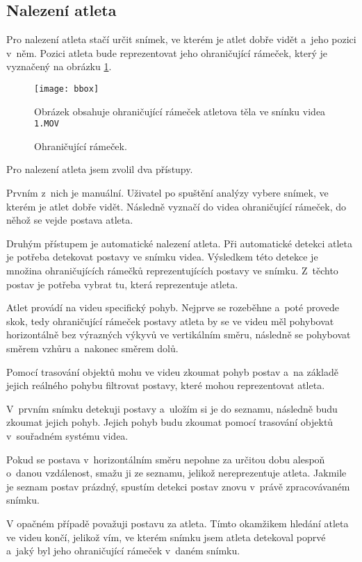 \subsection{Nalezení atleta}

Pro nalezení atleta stačí určit snímek, ve kterém je atlet dobře vidět a~jeho pozici v~něm. Pozici atleta bude reprezentovat jeho ohraničující rámeček, který je vyznačený na obrázku \ref{fig:bbox}.

\begin{figure}[h]\centering
    \texttt{[image: bbox]}
    \caption{Ohraničující rámeček.}
    \small
    Obrázek obsahuje ohraničující rámeček atletova těla ve snínku videa \texttt{1.MOV}
    \label{fig:bbox}
\end{figure}

Pro nalezení atleta jsem zvolil dva přístupy.

Prvním z~nich je manuální. Uživatel po spuštění analýzy vybere snímek, ve kterém je atlet dobře vidět. Následně vyznačí do videa ohraničující rámeček, do něhož se vejde postava atleta.

Druhým přístupem je automatické nalezení atleta. Při automatické detekci atleta je potřeba detekovat postavy ve snímku videa. Výsledkem této detekce je množina ohraničujících rámečků reprezentujících postavy ve snímku. Z~těchto postav je potřeba vybrat tu, která reprezentuje atleta.

Atlet provádí na videu specifický pohyb. Nejprve se rozeběhne a~poté provede skok, tedy ohraničující rámeček postavy atleta by se ve videu měl pohybovat horizontálně bez výrazných výkyvů ve vertikálním směru, následně se pohybovat směrem vzhůru a~nakonec směrem dolů.

Pomocí trasování objektů mohu ve videu zkoumat pohyb postav a~na základě jejich reálného pohybu filtrovat postavy, které mohou reprezentovat atleta.

V~prvním snímku detekuji postavy a~uložím si je do seznamu, následně budu zkoumat jejich pohyb. Jejich pohyb budu zkoumat pomocí trasování objektů v~souřadném systému videa.

Pokud se postava v~horizontálním směru nepohne za určitou dobu alespoň o~danou vzdálenost, smažu ji ze seznamu, jelikož nereprezentuje atleta. Jakmile je seznam postav prázdný, spustím detekci postav znovu v~právě zpracovávaném snímku.

V opačném případě považuji postavu za atleta. Tímto okamžikem hledání atleta ve videu končí, jelikož vím, ve kterém snímku jsem atleta detekoval poprvé a~jaký byl jeho ohraničující rámeček v~daném snímku.


